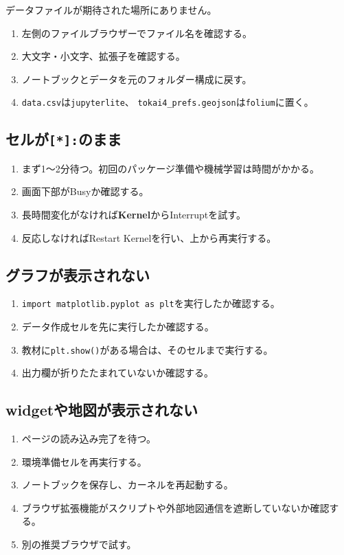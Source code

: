 \documentclass[a4paper,11pt]{ltjsarticle}
\newcommand{\menu}[1]{\textsf{\bfseries #1}}
\newcommand{\filepath}[1]{\nolinkurl{#1}}
\begin{document}
データファイルが期待された場所にありません。

\begin{enumerate}
  \item 左側のファイルブラウザーでファイル名を確認する。
  \item 大文字・小文字、拡張子を確認する。
  \item ノートブックとデータを元のフォルダー構成に戻す。
  \item \filepath{data.csv}は\filepath{jupyterlite}、
    \filepath{tokai4_prefs.geojson}は\filepath{folium}に置く。
\end{enumerate}

\subsection{セルが\texttt{[*]:}のまま}

\begin{enumerate}
  \item まず1～2分待つ。初回のパッケージ準備や機械学習は時間がかかる。
  \item 画面下部がBusyか確認する。
  \item 長時間変化がなければ\menu{Kernel}からInterruptを試す。
  \item 反応しなければRestart Kernelを行い、上から再実行する。
\end{enumerate}

\subsection{グラフが表示されない}

\begin{enumerate}
  \item \texttt{import matplotlib.pyplot as plt}を実行したか確認する。
  \item データ作成セルを先に実行したか確認する。
  \item 教材に\texttt{plt.show()}がある場合は、そのセルまで実行する。
  \item 出力欄が折りたたまれていないか確認する。
\end{enumerate}

\subsection{widgetや地図が表示されない}

\begin{enumerate}
  \item ページの読み込み完了を待つ。
  \item 環境準備セルを再実行する。
  \item ノートブックを保存し、カーネルを再起動する。
  \item ブラウザ拡張機能がスクリプトや外部地図通信を遮断していないか確認する。
  \item 別の推奨ブラウザで試す。
\end{enumerate}
\end{document}
